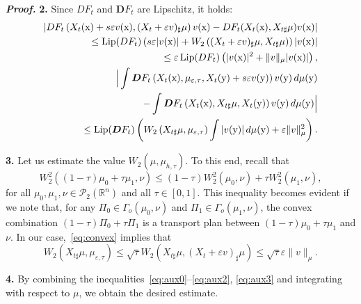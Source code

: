 \documentclass[sn-mathphys-num]{sn-jnl}
\numberwithin{equation}{section}
\theoremstyle{mythm}
\theoremstyle{mydef}
\renewenvironment{proof}{\smallskip\noindent\emph{\textbf{Proof.}}%
  \hspace{1pt}}{\hspace{-5pt}{\nobreak\quad\nobreak\hfill\nobreak%
    $\square$\vspace{2pt}\par}\smallskip\goodbreak}
\newcommand{\Lip}{\mathrm{Lip}}
\renewcommand{\d}{\,d}
\renewcommand{\mathbf}[1]{\bm{#1}}
\begin{document}
\begin{proof}
  \textbf{2.} Since \( DF_t \) and \( \mathbf{D}F_t \) are Lipschitz, it holds:
  \begin{align}
    \left| DF_{t} \left( X_t(\mathrm{x}) + s\varepsilon v(\mathrm{x}), (X_t + \varepsilon v)_{\sharp}\mu \right) v(\mathrm{x}) - DF_{t}(X_t(\mathrm{x}), X_{t\sharp}\mu) v(\mathrm{x}) \right|\notag \\
    \leq \Lip(DF_{t}) \left( s\varepsilon |v(\mathrm{x})| + W_2\left( (X_t + \varepsilon v)_{\sharp}\mu, X_{t\sharp}\mu \right) \right) |v(\mathrm{x})| \notag \\
    \leq \varepsilon \, \Lip(DF_{t}) \left( |v(\mathrm{x})|^2 + \|v\|_{\mu} |v(\mathrm{x})| \right),
    \label{eq:aux1}\\
    \hspace{-12pt}\Big| \int \mathbf{D}F_{t} \left(X_t(\mathrm{x}), \mu_{\varepsilon,\tau}, X_t(\mathrm{y}) + s\varepsilon v(\mathrm{y})\right) v(\mathrm{y}) \d \mu(\mathrm{y}) \notag \\
    - \int \mathbf{D}F_{t}\left(X_t(\mathrm{x}), X_{t\sharp}\mu, X_t(\mathrm{y})\right) v(\mathrm{y}) \d \mu(\mathrm{y}) \Big| \notag \\
    \leq \Lip(\mathbf{D}F_{t}) \left( W_2\left( X_{t\sharp}\mu, \mu_{\varepsilon,\tau} \right) \int |v(\mathrm{y})| \d \mu(\mathrm{y}) + \varepsilon \|v\|_{\mu}^2 \right). \label{eq:aux2}
  \end{align}

  \textbf{3.} Let us estimate the value \( W_2 \left( \mu, \mu_{h,\tau} \right) \).
  To this end, recall that
  \begin{equation}
    \label{eq:convex}
    W_{2}^{2} \left( (1 - \tau) \mu_0 + \tau \mu_1, \nu \right) \leq (1 - \tau) W_{2}^{2} (\mu_0, \nu) + \tau W_{2}^{2} (\mu_1, \nu),
  \end{equation}
  for all \( \mu_0, \mu_1, \nu \in \mathcal{P}_{2}(\mathbb{R}^n) \) and all \( \tau \in [0,1] \).
  This inequality becomes evident if we note that, for any \( \Pi_0 \in \Gamma_o(\mu_0, \nu) \) and \( \Pi_1 \in \Gamma_o(\mu_1, \nu) \), the convex combination \( (1 - \tau)\Pi_0 + \tau \Pi_1 \) is a transport plan between \( (1 - \tau) \mu_0 + \tau \mu_1 \) and \( \nu \).
  In our case,~\eqref{eq:convex} implies that
  \begin{equation}
    \label{eq:aux3}
    W_2 \left( X_{t\sharp}\mu, \mu_{\varepsilon,\tau} \right) \leq \sqrt{\tau} W_2 \left( X_{t\sharp}\mu, (X_t + \varepsilon v)_{\sharp}\mu \right) \leq \sqrt{\tau} \varepsilon \|v\|_{\mu}.
  \end{equation}
  
  \textbf{4.} By combining the inequalities~\eqref{eq:aux0}--\eqref{eq:aux2}, \eqref{eq:aux3} and integrating with respect to \( \mu \), we obtain the desired estimate.
\end{proof}
\end{document}
